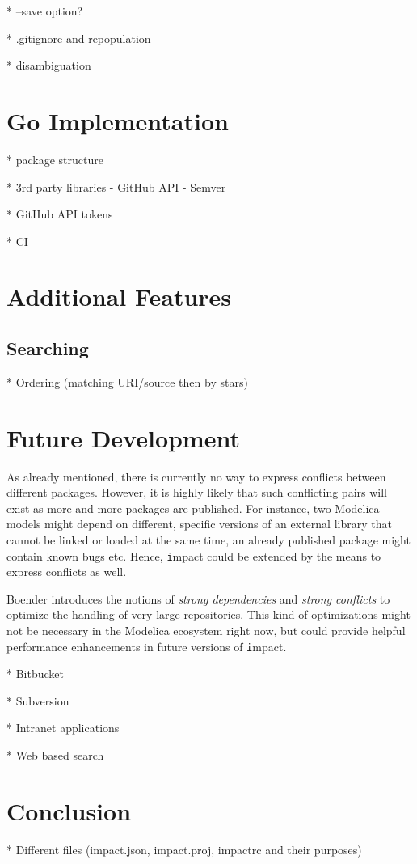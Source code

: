 \documentclass[11pt,a4paper,twocolumn]{article}
\renewcommand{\normalsize}{\fontsize{10.5pt}{12.3pt}\selectfont}
\renewcommand{\small}{\fontsize{9.5pt}{11.1pt}\selectfont}
\newcommand{\code}[1]{\texttt{#1}} %
\begin{document}
* --save option?

* .gitignore and repopulation

* disambiguation

\section{Go Implementation}

* package structure

* 3rd party libraries
  - GitHub API
  - Semver

* GitHub API tokens

* CI

\section{Additional Features}

\subsection{Searching}

* Ordering (matching URI/source then by stars)  

\section{Future Development}

As already mentioned, there is currently no way to express conflicts between different packages. 
However, it is highly likely that such conflicting pairs will exist as more and more packages are published. 
For instance, two Modelica models might depend on different, specific versions of an external library that 
cannot be linked or loaded at the same time, an already published package might contain known bugs etc. 
Hence, {\code impact} could be extended by the means to express conflicts as well.

Boender introduces the notions of {\em strong dependencies} and {\em strong conflicts} to optimize the handling
of very large repositories. 
This kind of optimizations might not be necessary in the Modelica ecosystem right now, but could provide helpful 
performance enhancements in future versions of {\code impact}.

* Bitbucket

* Subversion

* Intranet applications

* Web based search

\section{Conclusion}

* Different files (impact.json, impact.proj, impactrc and their purposes)


\small


\normalsize
\end{document}
